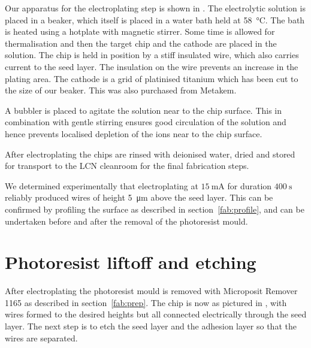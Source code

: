 Our apparatus for the electroplating step is shown in
. The electrolytic solution is placed in a
beaker, which itself is placed in a water bath held at \SI{58}{\celsius}. The
bath is heated using a hotplate with magnetic stirrer. Some time is allowed for
thermalisation and then the target chip and the cathode are placed in the
solution. The chip is held in position by a stiff insulated wire, which also
carries current to the seed layer. The insulation on the wire prevents an
increase in the plating area.  The cathode is a grid of platinised titanium
which has been cut to the size of our beaker. This was also purchased from
Metakem.

A bubbler is placed to agitate the solution near to the chip surface. This in
combination with gentle stirring ensures good circulation of the solution and
hence prevents localised depletion of the ions near to the chip
surface.~\cite{Schlesinger2011} 

After electroplating the chips are rinsed with deionised water, dried and stored
for transport to the LCN cleanroom for the final fabrication steps.

We determined experimentally that electroplating at $\SI{15}{\milli\ampere}$
for duration $\SI{400}{\second}$ reliably produced wires of height
\SI{5}{\micro\meter} above the seed layer. This can be confirmed by profiling
the surface as described in section~\ref{fab:profile}, and can be undertaken
before and after the removal of the photoresist mould. 
%

\section{Photoresist liftoff and etching}

After electroplating the photoresist mould is removed with Microposit Remover
1165 as described in section~\ref{fab:prep}. The chip is now as pictured in
, with wires formed to the desired heights but all
connected electrically through the seed layer. The next step is to etch the
seed layer and the adhesion layer so that the wires are separated.

